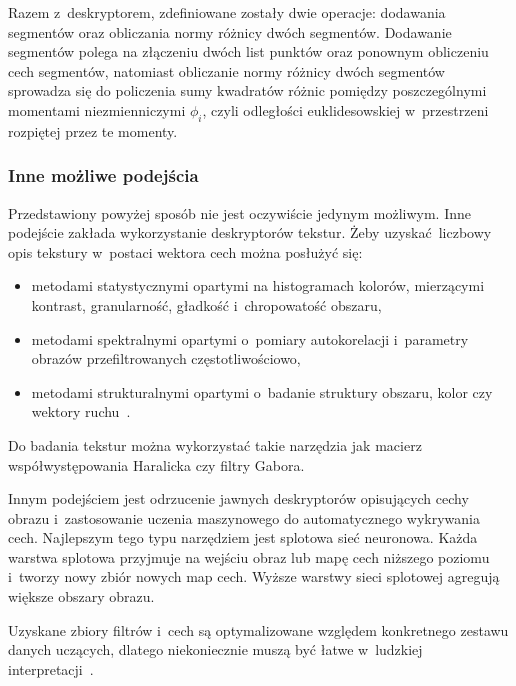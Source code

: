 Razem z~deskryptorem, zdefiniowane zostały dwie operacje: dodawania segmentów oraz obliczania normy różnicy dwóch segmentów. Dodawanie segmentów polega na złączeniu dwóch list punktów oraz ponownym obliczeniu cech segmentów, natomiast obliczanie normy różnicy dwóch segmentów sprowadza się do policzenia sumy kwadratów różnic pomiędzy poszczególnymi momentami niezmienniczymi $\phi_{i}$, czyli odległości euklidesowskiej w~przestrzeni rozpiętej przez te momenty.

\subsubsection{Inne możliwe podejścia}
Przedstawiony powyżej sposób nie jest oczywiście jedynym możliwym. Inne podejście zakłada wykorzystanie deskryptorów tekstur. Żeby uzyskać liczbowy opis tekstury w~postaci wektora cech można posłużyć się:
\begin{itemize}
    \item metodami statystycznymi opartymi na histogramach kolorów, mierzącymi kontrast, granularność, gładkość i~chropowatość obszaru,
    \item metodami spektralnymi opartymi o~pomiary autokorelacji i~parametry obrazów przefiltrowanych częstotliwościowo,
    \item metodami strukturalnymi opartymi o~badanie struktury obszaru, kolor czy wektory ruchu~\cite{perm:wyklad}.
\end{itemize} 

Do badania tekstur można wykorzystać takie narzędzia jak macierz współwystępowania Haralicka czy filtry Gabora. 

Innym podejściem jest odrzucenie jawnych deskryptorów opisujących cechy obrazu i~zastosowanie uczenia maszynowego do automatycznego wykrywania cech. Najlepszym tego typu narzędziem jest splotowa sieć neuronowa. Każda warstwa splotowa przyjmuje na wejściu obraz lub mapę cech niższego poziomu i~tworzy nowy zbiór nowych map cech. Wyższe warstwy sieci splotowej agregują większe obszary obrazu. 

Uzyskane zbiory filtrów i~cech są optymalizowane względem konkretnego zestawu danych uczących, dlatego niekoniecznie muszą być łatwe w~ludzkiej interpretacji~\cite{perm:wyklad}.